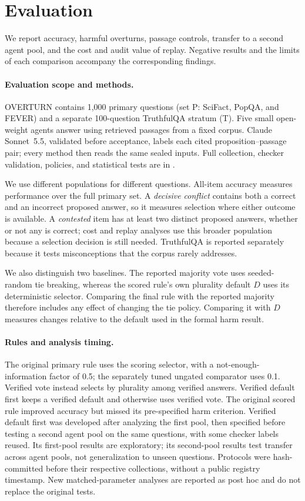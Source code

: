 \section{Evaluation}
\label{sec:evaluation}

We report accuracy, harmful overturns, passage controls, transfer to a second agent pool, and the cost and audit value of replay. Negative results and the limits of each comparison accompany the corresponding findings.

\paragraph{Evaluation scope and methods.} OVERTURN contains 1,000 primary questions (set P: SciFact, PopQA, and FEVER) and a separate 100-question TruthfulQA stratum (T). Five small open-weight agents answer using retrieved passages from a fixed corpus. Claude Sonnet~5.5, validated before acceptance, labels each cited proposition--passage pair; every method then reads the same sealed inputs. Full collection, checker validation, policies, and statistical tests are in .

We use different populations for different questions. All-item accuracy measures performance over the full primary set. A \emph{decisive conflict} contains both a correct and an incorrect proposed answer, so it measures selection where either outcome is available. A \emph{contested} item has at least two distinct proposed answers, whether or not any is correct; cost and replay analyses use this broader population because a selection decision is still needed. TruthfulQA is reported separately because it tests misconceptions that the corpus rarely addresses.

We also distinguish two baselines. The reported majority vote uses seeded-random tie breaking, whereas the scored rule's own plurality default $D$ uses its deterministic selector. Comparing the final rule with the reported majority therefore includes any effect of changing the tie policy. Comparing it with $D$ measures changes relative to the default used in the formal harm result.

\paragraph{Rules and analysis timing.} The original primary rule uses the scoring selector, with a not-enough-information factor of 0.5; the separately tuned ungated comparator uses 0.1. Verified vote instead selects by plurality among verified answers. Verified default first keeps a verified default and otherwise uses verified vote. The original scored rule improved accuracy but missed its pre-specified harm criterion. Verified default first was developed after analyzing the first pool, then specified before testing a second agent pool on the same questions, with some checker labels reused. Its first-pool results are exploratory; its second-pool results test transfer across agent pools, not generalization to unseen questions. Protocols were hash-committed before their respective collections, without a public registry timestamp. New matched-parameter analyses are reported as post hoc and do not replace the original tests.


